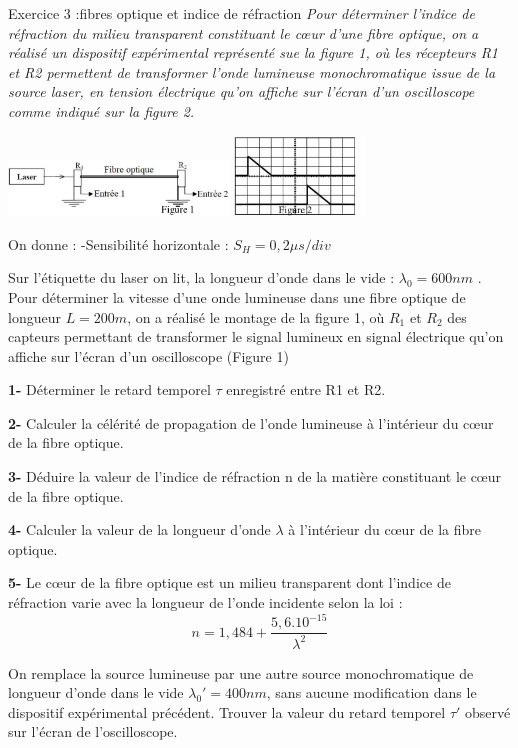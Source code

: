 \documentclass[12pt, french]{article}
\begin{document}
\begin{Box2}{Exercice 3 :fibres optique et indice de réfraction}
	\emph{Pour déterminer l’indice de réfraction du milieu transparent constituant le cœur d’une fibre
optique, on a réalisé un dispositif expérimental représenté sue la figure 1, où les récepteurs R1 et R2
permettent de transformer l’onde lumineuse monochromatique issue de la source laser, en tension
électrique qu’on affiche sur l’écran d’un oscilloscope comme indiqué sur la figure 2.}
  \begin{center}
	\includegraphics[width=0.44\textwidth]{./img/ex3_1.png}
	\includegraphics[width=0.26\textwidth]{./img/ex3_2.png}

  \end{center}

  On donne :  -Sensibilité horizontale : $S_H = 0,2 \mu{s}/div$

  Sur l’étiquette du laser on lit, la longueur d’onde dans le vide : $\lambda_0 = 600 nm$ .
Pour déterminer la vitesse d’une onde lumineuse dans une fibre optique de longueur $L = 200 m$, on
a réalisé le montage de la figure 1, où $R_1$ et $R_2$ des capteurs permettant de transformer le signal
lumineux en signal électrique qu’on affiche sur l’écran d’un oscilloscope (Figure 1)

\textbf{1- }Déterminer le retard temporel $\tau$ enregistré entre R1 et R2.

\textbf{2- }Calculer la célérité de propagation de l’onde lumineuse à l’intérieur du cœur de la fibre
optique.

\textbf{3- }Déduire la valeur de l’indice de réfraction n de la matière constituant le cœur de la fibre
optique.

\textbf{4- }Calculer la valeur de la longueur d’onde $\lambda$ à l’intérieur du cœur de la fibre optique.

\textbf{5- }Le cœur de la fibre optique est un milieu transparent dont l’indice de réfraction varie avec la
longueur de l’onde incidente selon la loi : $$n= 1,484 + \frac{5,6.10^{-15}}{\lambda^2}$$

On remplace la source lumineuse par une autre source monochromatique de longueur d’onde
dans le vide $\lambda_0' = 400 nm$, sans aucune modification dans le dispositif expérimental précédent.
Trouver la valeur du retard temporel $\tau'$ observé sur l’écran de l’oscilloscope.

\end{Box2}
\end{document}
